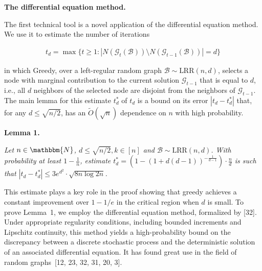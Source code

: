 \par\medskip\noindent\textbf{The differential equation method.}\par




The first technical tool is a novel application of the differential equation method. We use it to estimate the number of iterations\par


\[\begin{gathered}
t_{d}=\max\{t\geq 1:|N(\mathcal{G}_{t}(\mathcal{B}))\setminus N(\mathcal{G}_{t-1}(\mathcal{B}))|=d\}
\end{gathered}\]


in which Greedy, over a left-regular random graph $\mathcal{B}\sim\text{{LRR}}(n,d)$, selects a node with marginal contribution to the current solution $\mathcal{G}_{t-1}$ that is equal to $d$, i.e., all $d$ neighbors of the selected node are disjoint from the neighbors of $\mathcal{G}_{t-1}$. The main lemma for this estimate $t^{*}_{d}$ of $t_{d}$ is a bound on its error $|t_{d}-t^{*}_{d}|$ that, for any $d\leq\sqrt{n/2}$, has an $\tilde{O}(\sqrt{n})$ dependence on $n$ with high probability.\par





\par\medskip\noindent\textbf{\textbf{Lemma 1}\textbf{.}}\par



\emph{Let $n\in\mathbbm{N}$, $d\leq\sqrt{n/2},k\in[n]$ and $\mathcal{B}\sim\text{{LRR}}(n,d)$.
With probability at least $1-\frac{1}{n}$, estimate $t^{*}_{d}=\left(1-\left(1+d(d-1)\right)^{-\frac{1}{d-1}}\right)\cdot\frac{n}{d}$ is such that
$|t_{d}-t^{*}_{d}|\leq 3e^{d^{2}}\cdot\sqrt{8n\log{2n}}$.}\par






This estimate plays a key role in the proof showing that greedy achieves a constant improvement over $1-1/e$ in the critical region when $d$ is small. To prove Lemma 1, we employ the differential equation method, formalized by [32].
Under appropriate regularity conditions, including bounded increments and Lipschitz continuity, this method yields a high-probability bound on the discrepancy between a discrete stochastic process and the deterministic solution of an associated differential equation. It has found great use in the field of random graphs [12, 23, 32, 31, 20, 3].\par




